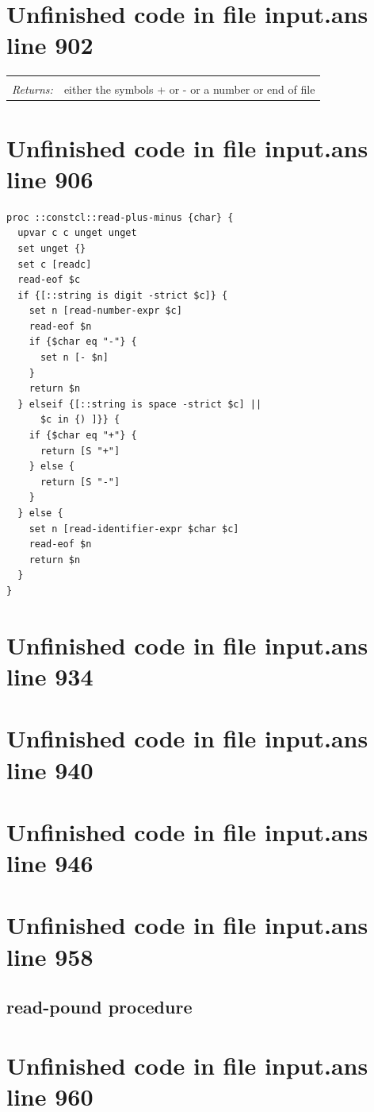 \documentclass[twoside,9pt]{report}
\begin{document}
\section{Unfinished code in file input.ans line 902}
\noindent\begin{tabular}{ |p{1.9cm} p{8cm}| }
\hline
\rowcolor[HTML]{CCCCCC} \multicolumn{2}{|l|}{\bf read-plus-minus (internal)} \\
\textit{Returns:} & either the symbols + or - or a number or end of file \\
\hline
\end{tabular}
\section{Unfinished code in file input.ans line 906}
\begin{lstlisting}
proc ::constcl::read-plus-minus {char} {
  upvar c c unget unget
  set unget {}
  set c [readc]
  read-eof $c
  if {[::string is digit -strict $c]} {
    set n [read-number-expr $c]
    read-eof $n
    if {$char eq "-"} {
      set n [- $n]
    }
    return $n
  } elseif {[::string is space -strict $c] ||
      $c in {) ]}} {
    if {$char eq "+"} {
      return [S "+"]
    } else {
      return [S "-"]
    }
  } else {
    set n [read-identifier-expr $char $c]
    read-eof $n
    return $n
  }
}
\end{lstlisting}
\section{Unfinished code in file input.ans line 934}
\section{Unfinished code in file input.ans line 940}
\section{Unfinished code in file input.ans line 946}
\section{Unfinished code in file input.ans line 958}
\subsection{read-pound procedure}
\label{read-pound-procedure}
\section{Unfinished code in file input.ans line 960}
\end{document}
